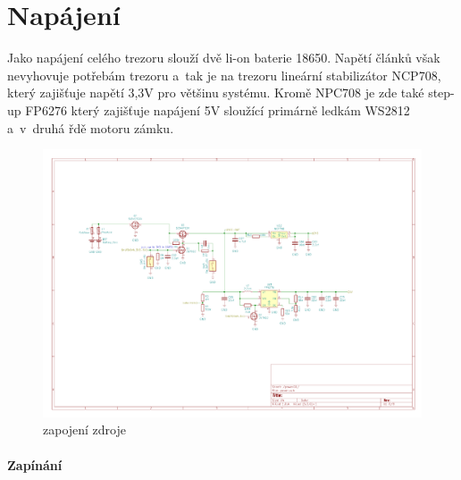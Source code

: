 \section{Napájení}

Jako napájení celého trezoru slouží dvě li-on baterie 18650. Napětí článků však nevyhovuje potřebám trezoru a~tak je na trezoru lineární 
stabilizátor NCP708, který zajišťuje napětí 3,3V pro většinu systému. Kromě NPC708 je zde také step-up FP6276 který zajišťuje napájení 5V 
sloužící primárně ledkám WS2812 a~v~druhá řdě motoru zámku. 

\begin{figure}[htbp]
    \centering
    \includegraphics[width=\textwidth]{kapitoly/obrazky/E4/napajeni/zdroj.pdf}
    \caption{zapojení zdroje}
    \label{fig:zdroj}
\end{figure}

\newpage

\paragraph*{Zapínání}

